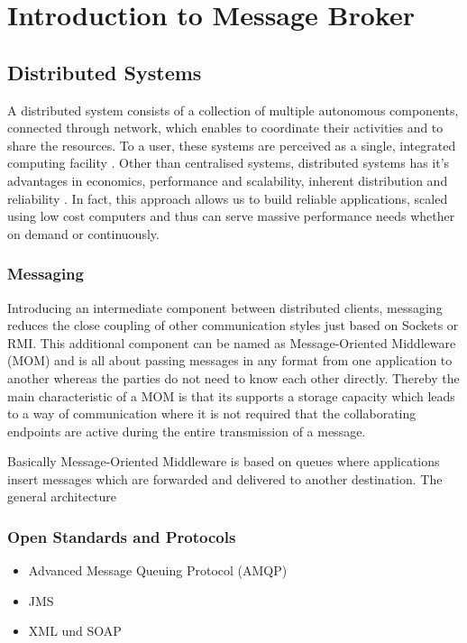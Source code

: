 \chapter{Introduction to Message Broker} 
\section{Distributed Systems} 
A distributed system consists of a collection of multiple autonomous components,
connected through network, which enables to coordinate their activities and to
share the resources. To a user, these systems are perceived as a single,
integrated computing facility \cite{TAN06}. Other than centralised systems,
distributed systems has it's advantages in economics, performance and
scalability, inherent distribution and reliability \cite{POSA1}.
In fact, this approach allows us to build reliable applications, 
scaled using low cost computers and thus can serve massive performance needs 
whether on demand or continuously.

\subsection{Messaging} 
Introducing an intermediate component between distributed
clients, messaging reduces the close coupling of other communication styles just
based on Sockets or RMI. This additional component can be named as
Message-Oriented Middleware (MOM) and is all about passing messages in any
format from one application to another whereas the parties do not need to know
each other directly. Thereby the main characteristic of a MOM is that its
supports a storage capacity which leads to a way of communication where it is
not required that the collaborating endpoints are active during the entire
transmission of a message.\cite{TAN06}
 

Basically Message-Oriented Middleware is based on queues where applications insert
messages which are forwarded and delivered to another destination. 
The general architecture 

\subsection{Open Standards and Protocols} 
\begin{itemize} 
	\item Advanced Message Queuing Protocol (AMQP) 
	\item JMS	
	\item XML und SOAP
\end{itemize}

